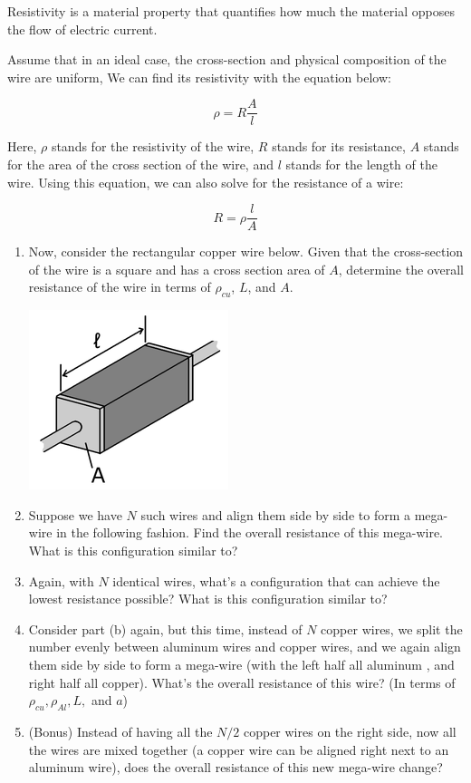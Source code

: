 
Resistivity is a material property that quantifies how much the material opposes the flow of electric current.

Assume that in an ideal case, the cross-section and physical composition of the wire are uniform, We can find its resistivity with the equation below:

$$\rho = R \frac{A}{l}$$

Here, $\rho$ stands for the resistivity of the wire, $R$ stands for its resistance, $A$ stands for the area of the cross section of the wire, and $l$ stands for the length of the wire. Using this equation, we can also solve for the resistance of a wire:

$$R = \rho \frac{l}{A}$$

\begin{enumerate}
    \item Now, consider the rectangular copper wire below. Given that the cross-section of the wire is a square and has a cross section area of $A$, determine the overall resistance of the wire in terms of $\rho_{cu}$, $L$, and $A$.
    \begin{center}
           \includegraphics[scale=0.6]{../../questionBank/week05/q_resistivity_figs/wire.png}
    \end{center}
    \item Suppose we have $N$ such wires and align them side by side to form a mega-wire in the following fashion. Find the overall resistance of this mega-wire. What is this configuration similar to?
    \item Again, with $N$ identical wires, what's a configuration that can achieve the lowest resistance possible? What is this configuration similar to?
    \item Consider part (b) again, but this time, instead of $N$ copper wires, we split the number evenly between aluminum wires and copper wires, and we again align them side by side to form a mega-wire (with the left half all aluminum , and right half all copper). What's the overall resistance of this wire? (In terms of $\rho_{cu}, \rho_{Al}, L, $ and $a$)
    \item (Bonus) Instead of having all the $N/2$ copper wires on the right side, now all the wires are mixed together (a copper wire can be aligned right next to an aluminum wire), does the overall resistance of this new mega-wire change?
\end{enumerate}
